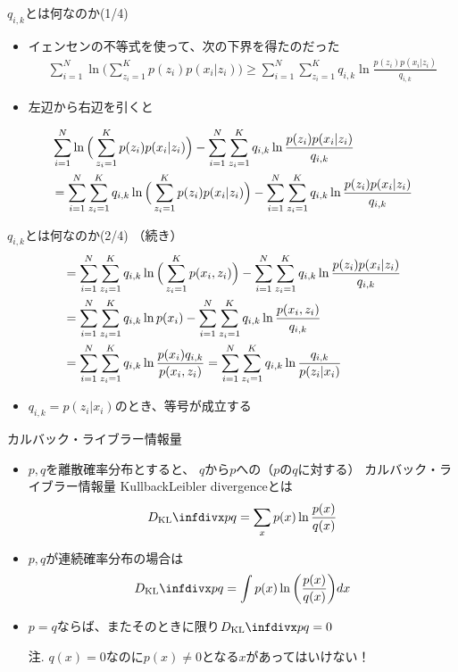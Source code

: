 \documentclass[aspectratio=169,unicode,dvipdfmx,14pt]{beamer}
\begin{document}
\begin{frame}{$q_{i,k}$とは何なのか(1/4)}
\begin{itemize}
\item イェンセンの不等式を使って、次の下界を得たのだった
\begin{align}
\sum_{i=1}^N \ln \Big( \sum_{z_i=1}^K p(z_i) p(x_i | z_i) \Big)
\geq 
\sum_{i=1}^N \sum_{z_i=1}^K q_{i,k} \ln\frac{p(z_i) p(x_i | z_i)}{q_{i,k}}
\end{align}
\item 左辺から右辺を引くと
\end{itemize}
\begin{align}
& \sum_{i=1}^N \ln \Big( \sum_{z_i=1}^K p(z_i) p(x_i | z_i) \Big)
- \sum_{i=1}^N \sum_{z_i=1}^K q_{i,k} \ln\frac{p(z_i) p(x_i | z_i)}{q_{i,k}}
\notag \\ &
= \sum_{i=1}^N \sum_{z_i=1}^K q_{i,k} \ln \Big( \sum_{z_i=1}^K p(z_i) p(x_i | z_i) \Big)
- \sum_{i=1}^N \sum_{z_i=1}^K q_{i,k} \ln\frac{p(z_i) p(x_i | z_i)}{q_{i,k}}
\notag
\end{align}
\end{frame}

\begin{frame}{$q_{i,k}$とは何なのか(2/4)}
（続き）
\begin{align}
&
= \sum_{i=1}^N \sum_{z_i=1}^K q_{i,k} \ln \Big( \sum_{z_i=1}^K p(x_i, z_i) \Big)
- \sum_{i=1}^N \sum_{z_i=1}^K q_{i,k} \ln\frac{p(z_i) p(x_i | z_i)}{q_{i,k}}
\notag \\
& = \sum_{i=1}^N \sum_{z_i=1}^K q_{i,k} \ln p(x_i)
- \sum_{i=1}^N \sum_{z_i=1}^K q_{i,k} \ln\frac{p(x_i, z_i)}{q_{i,k}}
\notag \\& 
= \sum_{i=1}^N \sum_{z_i=1}^K q_{i,k} \ln \frac{p(x_i) q_{i,k}}{p(x_i , z_i)}
= \sum_{i=1}^N \sum_{z_i=1}^K q_{i,k} \ln \frac{q_{i,k}}{p(z_i | x_i)}
\label{eq:diff}
\end{align}
\begin{itemize}
\item $q_{i,k}=p(z_i | x_i)$のとき、等号が成立する
\end{itemize}
\end{frame}


\begin{frame}{カルバック・ライブラー情報量}
\begin{itemize}
\item $p,q$を離散確率分布とすると、
$q$から$p$への{\small（$p$の$q$に対する）}
カルバック・ライブラー情報量 {\small KullbackLeibler divergence}とは
\begin{align}
\infdiv{p}{q} = \sum_{x} p(x) \ln \frac{p(x)}{q(x)}
\end{align}
\item $p,q$が連続確率分布の場合は
\begin{align}
\infdiv{p}{q} = \int p(x) \ln \bigg( \frac{p(x)}{q(x)} \bigg) dx
\end{align}
\item $p=q$ならば、またそのときに限り$\infdiv{p}{q} = 0$
\item[注.] $q(x) = 0$なのに$p(x) \neq 0$となる$x$があってはいけない！
\end{itemize}
\end{frame}
\end{document}
